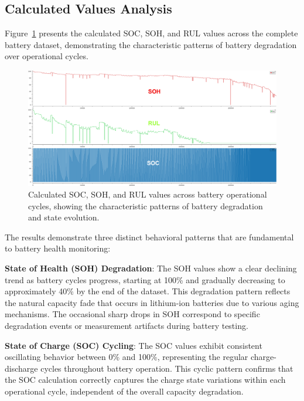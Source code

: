 \subsection{Calculated Values Analysis}
\label{subsec:calculated_values_analysis}

Figure~\ref{fig:calculated_values} presents the calculated SOC, SOH, and RUL values across the complete battery dataset, demonstrating the characteristic patterns of battery degradation over operational cycles.

\begin{figure}[htbp]
\centering
\includegraphics[width=1.0\textwidth]{imgs/soc_soh_rul.png}
\caption{Calculated SOC, SOH, and RUL values across battery operational cycles, showing the characteristic patterns of battery degradation and state evolution.}
\label{fig:calculated_values}
\end{figure}

The results demonstrate three distinct behavioral patterns that are fundamental to battery health monitoring:

\textbf{State of Health (SOH) Degradation}: The SOH values show a clear declining trend as battery cycles progress, starting at 100\% and gradually decreasing to approximately 40\% by the end of the dataset. This degradation pattern reflects the natural capacity fade that occurs in lithium-ion batteries due to various aging mechanisms. The occasional sharp drops in SOH correspond to specific degradation events or measurement artifacts during battery testing.

\textbf{State of Charge (SOC) Cycling}: The SOC values exhibit consistent oscillating behavior between 0\% and 100\%, representing the regular charge-discharge cycles throughout battery operation. This cyclic pattern confirms that the SOC calculation correctly captures the charge state variations within each operational cycle, independent of the overall capacity degradation.


